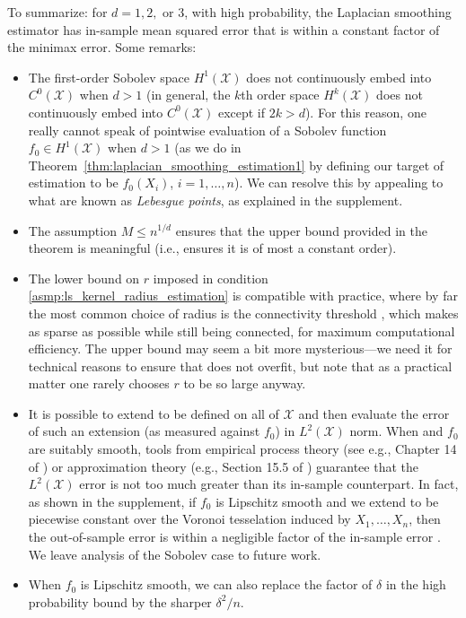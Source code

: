 \documentclass[twoside]{article}
\newcommand{\1}{\mathbf{1}}
\newcommand{\Xset}{\mathcal{X}}
\newcommand{\Leb}{L}
\newcommand{\wh}[1]{\widehat{#1}}
\theoremstyle{definition}
\theoremstyle{remark}
\begin{document}
To summarize: for $d = 1,2,$ or $3$, with high probability, the Laplacian smoothing estimator \smash{$\wh{f}$} has in-sample mean squared error that is within a constant factor of the minimax error. Some remarks:
\begin{itemize}
  \item The first-order Sobolev space $H^1(\Xset)$ does not continuously embed into $C^0(\Xset)$ when $d>1$ (in general, the $k$th order space $H^k(\Xset)$ does not continuously embed into $C^0(\Xset)$ except if $2k>d$). For this reason, one really cannot speak of pointwise evaluation of a Sobolev function $f_0 \in H^1(\Xset)$ when $d>1$ (as we do in Theorem~\ref{thm:laplacian_smoothing_estimation1} by defining our target of estimation to be $f_0(X_i)$, $i=1,\ldots,n$). We can resolve this by appealing to what are known as \emph{Lebesgue points}, as explained in the supplement.
	\item The assumption $M \leq n^{1/d}$ ensures that the upper bound provided in the theorem is meaningful (i.e., ensures it is of most a constant order).
	\item The lower bound on $r$ imposed in condition \ref{asmp:ls_kernel_radius_estimation} is compatible with practice, where by far the most common choice of radius is the connectivity threshold , which makes  as sparse as possible while still being connected, for maximum computational efficiency. The upper bound may seem a bit more mysterious---we need it for technical reasons to ensure that \smash{$\wh{f}$} does not overfit, but note that as a practical matter one rarely chooses $r$ to be so large anyway.
	\item It is possible to extend \smash{$\wh{f}$} to be defined on all of $\Xset$ and then evaluate the error of such an extension (as measured against $f_0$) in $\Leb^2(\Xset)$ norm. When \smash{$\wh{f}$} and $f_0$ are suitably smooth, tools from empirical process theory (see e.g., Chapter 14 of \citet{wainwright2019}) or approximation theory (e.g., Section 15.5 of \citet{johnstone2011}) guarantee that the $\Leb^2(\Xset)$ error is not too much greater than its in-sample counterpart. In fact, as shown in the supplement, if $f_0$ is Lipschitz smooth and we extend \smash{$\wh{f}$} to be piecewise constant over the Voronoi tesselation induced by $X_1,\ldots,X_n$, then the out-of-sample error \smash{$\|\wh{f}-f_0\|_{\Leb^2(\Xset)}$} is within a negligible factor of the in-sample error \smash{$\|\wh{f}-f_0\|_n$}. We leave analysis of the Sobolev case to future work.
	\item When $f_0$ is Lipschitz smooth, we can also replace the factor of $\delta$ in the high probability bound by the sharper $\delta^2/n$.
\end{itemize} 
\end{document}

